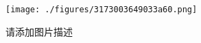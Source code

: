 
\begin{figure}[ht]
\centering
\texttt{[image: ./figures/3173003649033a60.png]}
\caption{请添加图片描述} \label{fig_test3_1}
\end{figure}